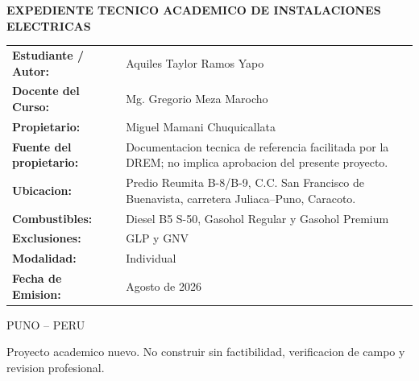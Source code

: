 \begin{titlepage}
\begin{minipage}{5.20in}
\vspace{0.25in}
{\fontsize{13}{16}\selectfont\bfseries EXPEDIENTE TECNICO ACADEMICO DE INSTALACIONES ELECTRICAS\par}

\vspace{0.25in}
\begin{flushleft}
\fontsize{9.3}{12}\selectfont
\renewcommand{\arraystretch}{1.18}
\begin{tabular}{>{\bfseries}p{1.72in}p{3.10in}}
Estudiante / Autor: & Aquiles Taylor Ramos Yapo \\
Docente del Curso: & Mg. Gregorio Meza Marocho \\
Propietario: & Miguel Mamani Chuquicallata \\
Fuente del propietario: & Documentacion tecnica de referencia facilitada por la DREM; no implica aprobacion del presente proyecto. \\
Ubicacion: & Predio Reumita B-8/B-9, C.C. San Francisco de Buenavista, carretera Juliaca--Puno, Caracoto. \\
Combustibles: & Diesel B5 S-50, Gasohol Regular y Gasohol Premium \\
Exclusiones: & GLP y GNV \\
Modalidad: & Individual \\
Fecha de Emision: & Agosto de 2026 \\
\end{tabular}
\end{flushleft}

\vfill
{\fontsize{10}{12}\selectfont PUNO -- PERU\par}
{\fontsize{9}{11}\par}
{\fontsize{7}{9}\selectfont Proyecto academico nuevo. No construir sin factibilidad, verificacion de campo y revision profesional.\par}
\end{minipage}
\end{titlepage}

